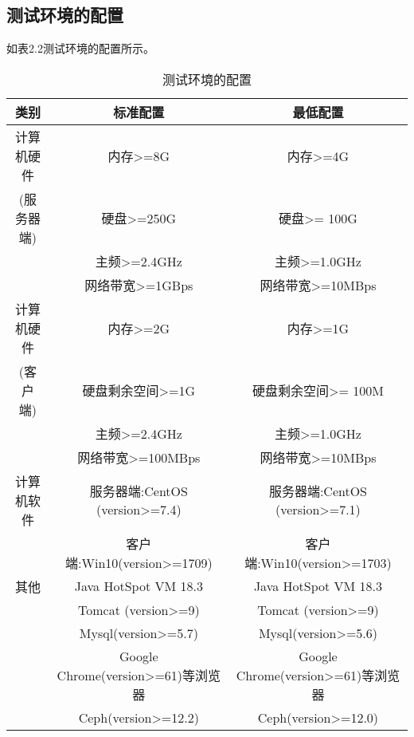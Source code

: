 \subsection{测试环境的配置}
如表2.2测试环境的配置所示。
\begin{table}[htbp]
\centering
\caption{测试环境的配置} \label{tab:test-environment}
\begin{tabular}{|c|c|c|}
    \hline
    类别 & 标准配置 & 最低配置 \\
    \hline
    计算机硬件 & 内存>=8G & 内存>=4G \\
    (服务器端)         & 硬盘>=250G & 硬盘>= 100G \\
             & 主频>=2.4GHz & 主频>=1.0GHz \\
             & 网络带宽>=1GBps & 网络带宽>=10MBps \\ 
    \hline
    计算机硬件 & 内存>=2G & 内存>=1G \\
    (客户端)         & 硬盘剩余空间>=1G & 硬盘剩余空间>= 100M \\
             & 主频>=2.4GHz & 主频>=1.0GHz \\
             & 网络带宽>=100MBps & 网络带宽>=10MBps \\ 
    \hline
    计算机软件 & 服务器端:CentOS (version>=7.4) & 服务器端:CentOS (version>=7.1)\\
             & 客户端:Win10(version>=1709) & 客户端:Win10(version>=1703)\\
    \hline
    其他 & Java HotSpot VM 18.3 &  Java HotSpot VM 18.3\\
        & Tomcat (version>=9) &  Tomcat (version>=9)\\ 
        & Mysql(version>=5.7) &  Mysql(version>=5.6)\\
        & Google Chrome(version>=61)等浏览器 &  Google Chrome(version>=61)等浏览器\\
        & Ceph(version>=12.2) &  Ceph(version>=12.0)\\
    \hline 

\end{tabular}
\end{table}

